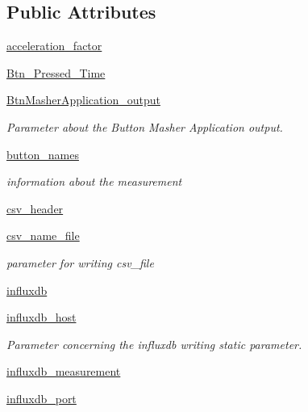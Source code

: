 \subsection*{Public Attributes}
\begin{DoxyCompactItemize}
\item 
\hyperlink{classRET__Parameter_1_1RET__Parameter_abd224cfc80b136898df89af7812fa8d5}{acceleration\+\_\+factor}
\item 
\hyperlink{classRET__Parameter_1_1RET__Parameter_a39e93ce131ad25f98c5ce27c3ab36a6e}{Btn\+\_\+\+Pressed\+\_\+\+Time}
\item 
\hyperlink{classRET__Parameter_1_1RET__Parameter_a2b7700878675832931a1182c86c13de3}{Btn\+Masher\+Application\+\_\+output}
\begin{DoxyCompactList}\small\item\em Parameter about the Button Masher Application output. \end{DoxyCompactList}\item 
\hyperlink{classRET__Parameter_1_1RET__Parameter_a62209bbfef695c79e2e4a3c58cde6904}{button\+\_\+names}
\begin{DoxyCompactList}\small\item\em information about the measurement \end{DoxyCompactList}\item 
\hyperlink{classRET__Parameter_1_1RET__Parameter_a6a998519b5c6ea893e0afee65eccbf93}{csv\+\_\+header}
\item 
\hyperlink{classRET__Parameter_1_1RET__Parameter_a195beb1936a2c54c9c5b84ee44779c23}{csv\+\_\+name\+\_\+file}
\begin{DoxyCompactList}\small\item\em parameter for writing csv\+\_\+file \end{DoxyCompactList}\item 
\hyperlink{classRET__Parameter_1_1RET__Parameter_a034f595b48aad7217bd228d3620eaca8}{influxdb}
\item 
\hyperlink{classRET__Parameter_1_1RET__Parameter_a2c910a8a000ce837b18cf2959297dcce}{influxdb\+\_\+host}
\begin{DoxyCompactList}\small\item\em Parameter concerning the influxdb writing static parameter. \end{DoxyCompactList}\item 
\hyperlink{classRET__Parameter_1_1RET__Parameter_a2951333e048b79a878571eafd1eee541}{influxdb\+\_\+measurement}
\item 
\hyperlink{classRET__Parameter_1_1RET__Parameter_a0d892e15d9fa78818d4495560d962ec2}{influxdb\+\_\+port}

\end{DoxyCompactItemize}
